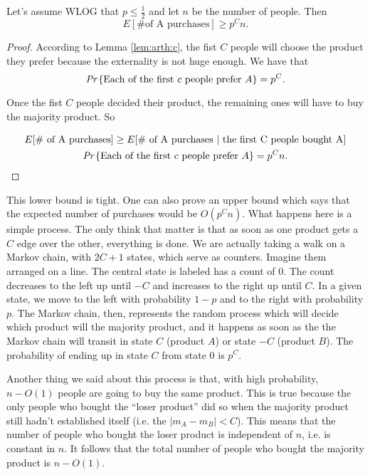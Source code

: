 \begin{claim}
	Let's assume WLOG that $p \leq \frac{1}{2}$ and let $n$ be the number of people. Then
	\begin{equation}
		E[\text{\# of A purchases}] \geq p^Cn.
	\end{equation}
\end{claim}
\begin{proof}
	According to Lemma \ref{lem:arth:c}, the fist $C$ people will choose the product they prefer because the externality is not huge enough. We have that
	\begin{equation}
		\emph{Pr}\left\{\text{Each of the first } c \text{ people prefer } A\right\} = p^C.
	\end{equation}
	
	Once the fist $C$ people decided their product, the remaining ones will have to buy the majority product. So
	
	\begin{multline}
			E[\text{\# of A purchases}] \geq E[\text{\# of A purchases } | \text{ the first C people bought A}]\\ \emph{Pr}\left\{\text{Each of the first } c \text{ people prefer } A\right\} = p^Cn.
	\end{multline}
\end{proof}
This lower bound is tight. One can also prove an upper bound which says that the expected number of purchases would be $O(p^Cn)$. What happens here is a simple process. The only think that matter is that as soon as one product gets a $C$ edge over the other, everything is done. We are actually taking a walk on a Markov chain, with $2C + 1$ states, which serve as counters. Imagine them arranged on a line. The central state is labeled has a count of 0. The count decreases to the left up until $-C$ and increases to the right up until $C$. In a given state, we move to the left with probability $1 -p$ and to the right with probability $p$. The Markov chain, then, represents the random process which will decide which product will the majority product, and it happens as soon as the the Markov chain will transit in state $C$ (product $A$) or state $-C$ (product $B$). The probability of ending up in state $C$ from state $0$ is $p^C$.

Another thing we said about this process is that, with high probability, $n - O(1)$ people are going to buy the same product. This is true because the only people who bought the ``loser product'' did so when the majority product still hadn't established itself (i.e. the $|m_A - m_B| < C$). This means that the number of people who bought the loser product is independent of $n$, i.e. is constant in $n$. It follows that the total number of people who bought the majority product is $n - O(1)$.

